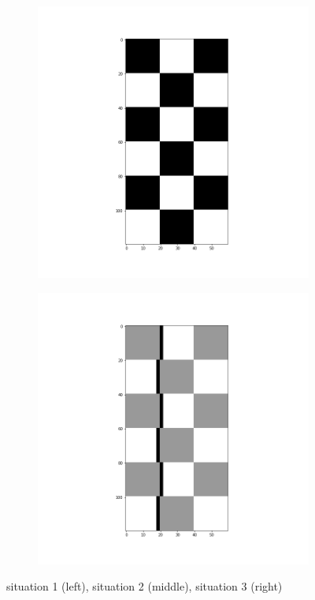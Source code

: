 \documentclass[a4paper,12pt,twoside]{article}
\begin{document}
\begin{figure}[!h]
\begin{subfigure}[b]{0.3\textwidth}
		 		\includegraphics[scale=0.2]{situation2.png}
		 	\end{subfigure}
		 	\begin{subfigure}[b]{0.3\textwidth}
		 		\includegraphics[scale=0.2]{situation3.png}
		 	\end{subfigure}
		 	\caption{situation 1 (left), situation 2 (middle), situation 3 (right)}
		 	\label{flawed detailed balance}			
		 \end{figure}
		 
\end{document}
